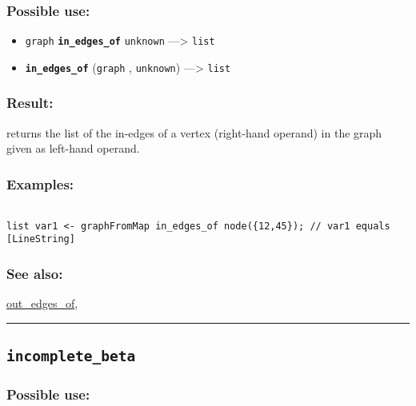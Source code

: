 \documentclass[]{book}
\providecommand{\tightlist}{%
  \setlength{\itemsep}{0pt}\setlength{\parskip}{0pt}}
\theoremstyle{definition}
\theoremstyle{definition}
\theoremstyle{definition}
\theoremstyle{remark}
\begin{document}
\subsubsection{Possible use:}\label{possible-use-268}

\begin{itemize}
\tightlist
\item
  \texttt{graph} \textbf{\texttt{in\_edges\_of}} \texttt{unknown}
  ---\textgreater{} \texttt{list}
\item
  \textbf{\texttt{in\_edges\_of}} (\texttt{graph} , \texttt{unknown})
  ---\textgreater{} \texttt{list}
\end{itemize}

\subsubsection{Result:}\label{result-258}

returns the list of the in-edges of a vertex (right-hand operand) in the
graph given as left-hand operand.

\subsubsection{Examples:}\label{examples-206}

\begin{verbatim}
 
list var1 <- graphFromMap in_edges_of node({12,45}); // var1 equals [LineString]
\end{verbatim}

\subsubsection{See also:}\label{see-also-116}

\href{OperatorsNR\#out_edges_of}{out\_edges\_of},

\begin{center}\rule{0.5\linewidth}{\linethickness}\end{center}

\subsection{\texorpdfstring{\texttt{incomplete\_beta}}{incomplete\_beta}}\label{incomplete_beta}

\subsubsection{Possible use:}\label{possible-use-269}
\end{document}
